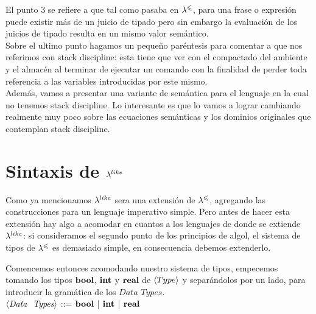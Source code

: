 El punto 3 se refiere a que tal como pasaba en $\lambda^{\leqslant}$, para una frase o expresi\'on
puede existir m\'as de un juicio de tipado pero sin embargo la evaluaci\'on de los
juicios de tipado resulta en un mismo valor sem\'antico.\\

Sobre el ultimo punto hagamos un pequeño par\'entesis para comentar a que nos
referimos con stack discipline: esta tiene que ver con el compactado del ambiente
y el almac\'en al terminar de ejecutar un comando con la finalidad de perder toda
referencia a las variables introducidas por este mismo.\\
Adem\'as, vamos a presentar una variante de sem\'antica para el lenguaje
en la cual no tenemos stack discipline. Lo interesante es que lo vamos a lograr cambiando
realmente muy poco sobre las ecuaciones sem\'anticas y los dominios originales que
contemplan stack discipline.

\section{Sintaxis de $\lambda^{like}$}

Como ya mencionamos $\lambda^{like}$ sera una extensi\'on de $\lambda^{\leqslant}$, agregando las
construcciones para un lenguaje imperativo simple. Pero antes de hacer esta extensi\'on
hay algo a acomodar en cuantos a los lenguajes de donde se extiende $\lambda^{like}$: 
si consideramos el segundo punto de los principios de algol, el sistema de tipos
de $\lambda^{\leqslant}$ es demasiado simple, en consecuencia debemos extenderlo.

Comencemos entonces acomodando nuestro sistema de tipos, empecemos tomando los tipos
$\textbf{bool}$, $\textbf{int}$ y $\textbf{real}$ de $\langle Type \rangle$ y separándolos por un lado, para
introducir la gram\'atica de los  $\textit{Data Types}$.\\

\noindent
$\langle \textit{Data \ Types} \rangle$ ::= $\textbf{bool}$ | $\textbf{int}$ | $\textbf{real}$\\

